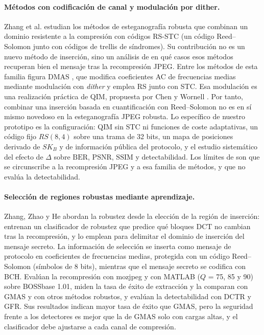 \documentclass[IB]{TFUOC}%
\begin{document}
\paragraph{Métodos con codificación de canal y modulación por dither.} Zhang et al. \cite{20} estudian los métodos de esteganografía robusta que combinan un dominio resistente a la compresión con códigos RS-STC (un código Reed--Solomon junto con códigos de trellis de síndromes). Su contribución no es un nuevo método de inserción, sino un análisis de en qué casos esos métodos recuperan bien el mensaje tras la recompresión JPEG. Entre los métodos de esta familia figura DMAS \cite{zhang2018dmas}, que modifica coeficientes AC de frecuencias medias mediante modulación con \textit{dither} y emplea RS junto con STC. Esa modulación es una realización práctica de QIM, propuesta por Chen y Wornell \cite{11}. Por tanto, combinar una inserción basada en cuantificación con Reed--Solomon no es en sí mismo novedoso en la esteganografía JPEG robusta. Lo específico de nuestro prototipo es la configuración: QIM sin STC ni funciones de coste adaptativas, un código fijo $RS(8,4)$ sobre una trama de 32 bits, un mapa de posiciones derivado de $SK_B$ y de información pública del protocolo, y el estudio sistemático del efecto de $\Delta$ sobre $\mathrm{BER}$, $\mathrm{PSNR}$, $\mathrm{SSIM}$ y detectabilidad. Los límites de \cite{20} son que se circunscribe a la recompresión JPEG y a esa familia de métodos, y que no evalúa la detectabilidad.

\paragraph{Selección de regiones robustas mediante aprendizaje.} Zhang, Zhao y He \cite{18} abordan la robustez desde la elección de la región de inserción: entrenan un clasificador de robustez que predice qué bloques DCT no cambian tras la recompresión, y lo emplean para delimitar el dominio de inserción del mensaje secreto. La información de selección se inserta como mensaje de protocolo en coeficientes de frecuencias medias, protegida con un código Reed--Solomon (símbolos de 8 bits), mientras que el mensaje secreto se codifica con BCH. Evalúan la recompresión con mozjpeg y con MATLAB ($Q$ = 75, 85 y 90) sobre BOSSbase 1.01, miden la tasa de éxito de extracción y la comparan con GMAS y con otros métodos robustos, y evalúan la detectabilidad con DCTR y GFR. Sus resultados indican mayor tasa de éxito que GMAS, pero la seguridad frente a los detectores es mejor que la de GMAS solo con cargas altas, y el clasificador debe ajustarse a cada canal de compresión.
\end{document}
